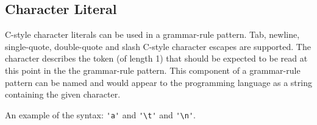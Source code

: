 
\subsection{Character Literal}
{
	C-style character literals can be used in a grammar-rule pattern.
	Tab, newline, single-quote, double-quote and slash C-style character
	escapes are supported.
	The character describes the token (of length 1) that should be expected
	to be read at this point in the the grammar-rule pattern.
	This component of a grammar-rule pattern can be named and would appear to
	the programming language as a string containing the given character.
	
	An example of the syntax: \lstinline[language=MAIA, columns=fixed]@'a'@
	and \lstinline[language=MAIA, columns=fixed]@'\t'@
	and \lstinline[language=MAIA, columns=fixed]@'\n'@.
}
